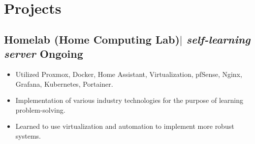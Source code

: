 \documentclass[11pt]{article} %
\begin{document}
\section{Projects}
\subsection{Homelab (Home Computing Lab)$|$ \normalfont\textit{self-learning server} \hfill Ongoing} %
\begin{itemize}
  \item Utilized Proxmox, Docker, Home Assistant, Virtualization, pfSense, Nginx, Grafana, Kubernetes, Portainer.
  \item Implementation of various industry technologies for the purpose of learning problem-solving.
  \item Learned to use virtualization and automation to implement more robust systems.
\end{itemize}
\end{document}
